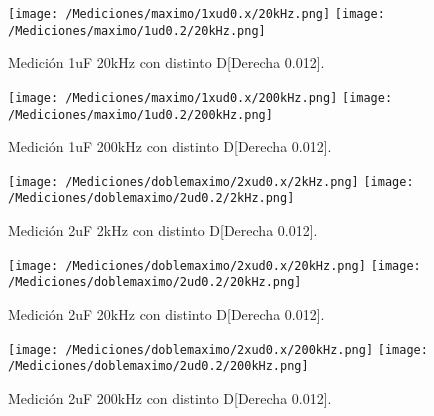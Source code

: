 \begin{figure}[H]
	\centering
	\texttt{[image: /Mediciones/maximo/1xud0.x/20kHz.png]}
	\texttt{[image: /Mediciones/maximo/1ud0.2/20kHz.png]}
\caption{Medición 1uF 20kHz con distinto D[Derecha 0.012].}
	\label{fig:fcon}
\end{figure}
\begin{figure}[H]
	\centering
	\texttt{[image: /Mediciones/maximo/1xud0.x/200kHz.png]}
	\texttt{[image: /Mediciones/maximo/1ud0.2/200kHz.png]}
\caption{Medición 1uF 200kHz con distinto D[Derecha 0.012].}
	\label{fig:fcon}
\end{figure}
\begin{figure}[H]
	\centering
	\texttt{[image: /Mediciones/doblemaximo/2xud0.x/2kHz.png]}
	\texttt{[image: /Mediciones/doblemaximo/2ud0.2/2kHz.png]}
\caption{Medición 2uF 2kHz con distinto D[Derecha 0.012].}
	\label{fig:fcon}
\end{figure}
\begin{figure}[H]
	\centering
	\texttt{[image: /Mediciones/doblemaximo/2xud0.x/20kHz.png]}
	\texttt{[image: /Mediciones/doblemaximo/2ud0.2/20kHz.png]}
\caption{Medición 2uF 20kHz con distinto D[Derecha 0.012].}
	\label{fig:fcon}
\end{figure}
\begin{figure}[H]
	\centering
	\texttt{[image: /Mediciones/doblemaximo/2xud0.x/200kHz.png]}
	\texttt{[image: /Mediciones/doblemaximo/2ud0.2/200kHz.png]}
\caption{Medición 2uF 200kHz con distinto D[Derecha 0.012].}
	\label{fig:fcon}
\end{figure}
